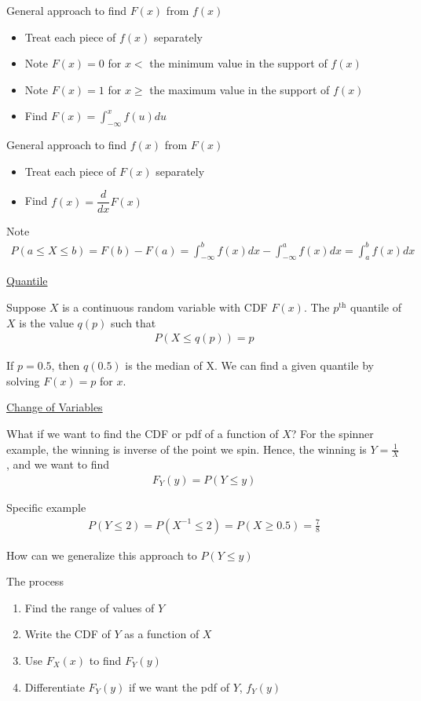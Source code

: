 \documentclass{article}
\begin{document}
General approach to find $F(x)$ from $f(x)$
\begin{itemize}
    \item Treat each piece of $f(x)$ separately
    \item Note $F(x) = 0$ for $x < $ the minimum value in the support of $f(x)$
    \item Note $F(x) = 1$ for $x \ge$ the maximum value in the support of $f(x)$
    \item Find $F(x) = \int_{-\infty}^x f(u)du$
\end{itemize}

General approach to find $f(x)$ from $F(x)$
\begin{itemize}
    \item Treat each piece of $F(x)$ separately
    \item Find $f(x) = \dfrac{d}{dx}F(x)$
\end{itemize}

Note
\begin{align*}
    P(a \le X \le b) = F(b) - F(a) = \int_{-\infty}^bf(x)dx - \int_{-\infty}^af(x)dx = \int_a^bf(x)dx
\end{align*}

\underline{Quantile}

Suppose $X$ is a continuous random variable with CDF $F(x)$. The $p^{\text{th}}$ quantile of $X$ is the value $q(p)$ such that
\begin{align*}
    P(X \le q(p)) = p
\end{align*}

If $p = 0.5$, then $q(0.5)$ is the median of X. We can find a given quantile by solving $F(x) = p $ for $x$. 


\underline{Change of Variables}

What if we want to find the CDF or pdf of a function of $X$? For the spinner example, the winning is inverse of the point we spin. Hence, the winning is $Y = \frac{1}{X}$, and we want to find
\begin{align*}
    F_Y(y) = P(Y \le y)
\end{align*}

Specific example
\begin{align*}
    P(Y \le 2) = P(X^{-1} \le 2) = P(X \ge 0.5) = \frac{7}{8}
\end{align*}

How can we generalize this approach to $P(Y \le y)$

The process
\begin{enumerate}
    \item Find the range of values of $Y$
    \item Write the CDF of $Y$ as a function of $X$
    \item Use $F_X(x)$ to find $F_Y(y)$
    \item Differentiate $F_Y(y)$ if we want the pdf of $Y$, $f_Y(y)$
\end{enumerate}
\end{document}
